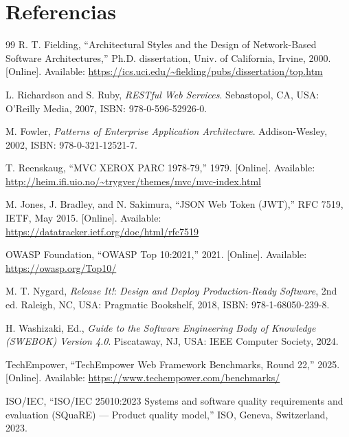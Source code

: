 \section*{Referencias}
\begin{thebibliography}{99}
\setlength{\itemsep}{4pt}
 R. T. Fielding, ``Architectural Styles and the Design of Network-Based Software
Architectures,'' Ph.D. dissertation, Univ. of California, Irvine, 2000. [Online]. Available:
\url{https://ics.uci.edu/~fielding/pubs/dissertation/top.htm}

 L. Richardson and S. Ruby, \textit{RESTful Web Services}. Sebastopol, CA, USA: O'Reilly
Media, 2007, ISBN: 978-0-596-52926-0.

 M. Fowler, \textit{Patterns of Enterprise Application Architecture}. Addison-Wesley, 2002,
ISBN: 978-0-321-12521-7.

 T. Reenskaug, ``MVC XEROX PARC 1978-79,'' 1979. [Online]. Available:
\url{http://heim.ifi.uio.no/~trygver/themes/mvc/mvc-index.html}

 M. Jones, J. Bradley, and N. Sakimura, ``JSON Web Token (JWT),'' RFC 7519, IETF, May 2015.
[Online]. Available: \url{https://datatracker.ietf.org/doc/html/rfc7519}

 OWASP Foundation, ``OWASP Top 10:2021,'' 2021. [Online]. Available:
\url{https://owasp.org/Top10/}

 M. T. Nygard, \textit{Release It!}: \textit{Design and Deploy Production-Ready Software}, 2nd
ed. Raleigh, NC, USA: Pragmatic Bookshelf, 2018, ISBN: 978-1-68050-239-8.

 H. Washizaki, Ed., \textit{Guide to the Software Engineering Body of Knowledge (SWEBOK)
Version 4.0}. Piscataway, NJ, USA: IEEE Computer Society, 2024.

 TechEmpower, ``TechEmpower Web Framework Benchmarks, Round 22,'' 2025. [Online]. Available:
\url{https://www.techempower.com/benchmarks/}

 ISO/IEC, ``ISO/IEC 25010:2023 Systems and software quality requirements and evaluation
(SQuaRE) --- Product quality model,'' ISO, Geneva, Switzerland, 2023.
\end{thebibliography}